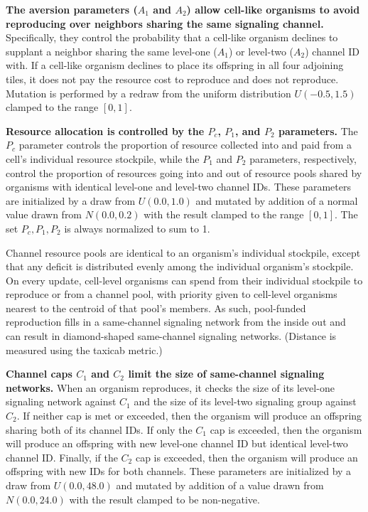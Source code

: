 \textbf{
The aversion parameters ($A_1$ and $A_2$) allow cell-like organisms to avoid reproducing over neighbors sharing the same signaling channel.
}
Specifically, they control the probability that a cell-like organism declines to supplant a neighbor sharing the same level-one ($A_1$) or level-two ($A_2$) channel ID with.
If a cell-like organism declines to place its offspring in all four adjoining tiles, it does not pay the resource cost to reproduce and does not reproduce.
Mutation is performed by a redraw from the uniform distribution $U(-0.5,1.5)$ clamped to the range $[0,1]$.

\textbf{
Resource allocation is controlled by the $P_{c}$, $P_1$, and $P_2$ parameters.
}
The $P_{c}$ parameter controls the proportion of resource collected into and paid from a cell's individual resource stockpile, while the $P_1$ and $P_2$ parameters, respectively, control the proportion of resources going into and out of resource pools shared by organisms with identical level-one and level-two channel IDs.
These parameters are initialized by a draw from $U(0.0, 1.0)$ and mutated by addition of a normal value drawn from $N(0.0,0.2)$ with the result clamped to the range $[0,1]$.
The set $P_{c}, P_1, P_2$ is always normalized to sum to 1.

Channel resource pools are identical to an organism's individual stockpile, except that any deficit is distributed evenly among the individual organism's stockpile.
On every update, cell-level organisms can spend from their individual stockpile to reproduce or from a channel pool, with priority given to cell-level organisms nearest to the centroid of that pool's members.
As such, pool-funded reproduction fills in a same-channel signaling network from the inside out and can result in diamond-shaped same-channel signaling networks.
(Distance is measured using the taxicab metric.)

\textbf{
Channel caps $C_1$ and $C_2$ limit the size of same-channel signaling networks.
}
When an organism reproduces, it checks the size of its level-one signaling network against $C_1$ and the size of its level-two signaling group against $C_2$.
If neither cap is met or exceeded, then the organism will produce an offspring sharing both of its channel IDs.
If only the $C_1$ cap is exceeded, then the organism will produce an offspring with new level-one channel ID but identical level-two channel ID.
Finally, if the $C_2$ cap is exceeded, then the organism will produce an offspring with new IDs for both channels.
These parameters are initialized by a draw from $U(0.0, 48.0)$ and mutated by addition of a value drawn from $N(0.0,24.0)$ with the result clamped to be non-negative.

